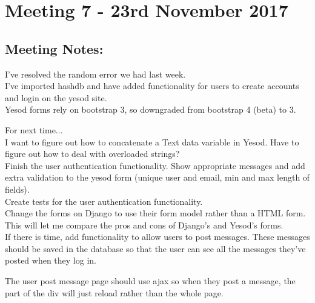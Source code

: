 \section{Meeting 7 - 23rd November 2017}

\subsection{Meeting Notes:}

I’ve resolved the random error we had last week.\\
I’ve imported hashdb and have added functionality for users to create accounts and login on the yesod site.\\
Yesod forms rely on bootstrap 3, so downgraded from bootstrap 4 (beta) to 3.

For next time...\\
I want to figure out how to concatenate a Text data variable in Yesod. Have to figure out how to deal with overloaded strings?\\
Finish the user authentication functionality. Show appropriate messages and add extra validation to the yesod form (unique user and email, min and max length of fields).\\
Create tests for the user authentication functionality.\\
Change the forms on Django to use their form model rather than a HTML form. This will let me compare the pros and cons of Django’s and Yesod’s forms.\\
If there is time, add functionality to allow users to post messages. These messages should be saved in the database so that the user can see all the messages they’ve posted when they log in.

The user post message page should use ajax so when they post a message, the part of the div will just reload rather than the whole page.
